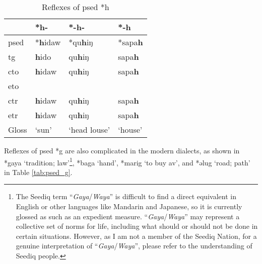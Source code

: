 \begin{table}[!htbp]
\centering
\caption{Reflexes of \acl{psed} *h}
\label{tab:psed_h}
\begin{tabular}{llll}
\hline
           & *h-    & *-h-         & *-h     \\ \hline
\acs{psed} & *\textbf{h}idaw & *qu\textbf{h}iŋ       & *sapa\textbf{h}  \\ \hdashline
\acs{tg}   & \textbf{h}ido   & qu\textbf{h}iŋ        & sapa\textbf{h}   \\
\acs{cto}  & \textbf{h}idaw  & qu\textbf{h}iŋ        & sapa\textbf{h}   \\
\acs{eto}  &        &              &         \\
\acs{ctr}  & \textbf{h}idaw  & qu\textbf{h}iŋ        & sapa\textbf{h}   \\
\acs{etr}  & \textbf{h}idaw  & qu\textbf{h}iŋ        & sapa\textbf{h}   \\ \hline
Gloss      & `sun'  & `head louse' & `house' \\ \hline
\end{tabular}
\end{table}

Reflexes of \acl{psed} *g are also complicated in the modern dialects, as shown in *gaya `tradition; law'\footnote{The Seediq term ``\textit{Gaya}/\textit{Waya}'' is difficult to find a direct equivalent in English or other languages like Mandarin and Japanese, so it is currently glossed as such as an expedient measure. ``\textit{Gaya}/\textit{Waya}'' may represent a collective set of norms for life, including what should or should not be done in certain situations. However, as I am not a member of the Seediq Nation, for a genuine interpretation of ``\textit{Gaya}/\textit{Waya}'', please refer to the understanding of Seediq people.}, *baga `hand', *marig `to buy \acs{av}', and *əlug `road; path' in Table \ref{tab:psed_g}.  

